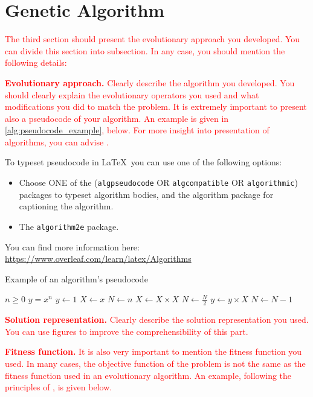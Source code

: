 \section{Genetic Algorithm}
\label{sec:algorithm}

\textcolor{red}{The third section should present the evolutionary approach you developed. You can divide this section into subsection. In any case, you should mention the following details:}

\textcolor{red}{\textbf{Evolutionary approach.} Clearly describe the algorithm you developed. You should clearly explain the evolutionary operators you used and what modifications you did to match the problem. It is extremely important to present also a pseudocode of your algorithm. An example is given in \ref{alg:pseudocode_example}, below. For more insight into presentation of algorithms, you can advise \cite{zobel2014algorithms}.}

{
\color{red}To typeset pseudocode in \LaTeX\ you can use one of the following options:
\begin{itemize}
    \item Choose ONE of the (\texttt{algpseudocode} OR \texttt{algcompatible} OR \texttt{algorithmic}) packages to typeset algorithm bodies, and the algorithm package for captioning the algorithm.
    \item The \texttt{algorithm2e} package.
\end{itemize}
You can find more information here: \url{https://www.overleaf.com/learn/latex/Algorithms}
}

\begin{algorithm}
\caption{Example of an algorithm's pseudocode}\label{alg:pseudocode_example}
\begin{algorithmic}
\Require $n \geq 0$
\Ensure $y = x^n$
\State $y \gets 1$
\State $X \gets x$
\State $N \gets n$
    \State $X \gets X \times X$
    \State $N \gets \frac{N}{2}$  
    \State $y \gets y \times X$
    \State $N \gets N - 1$
\EndIf
\EndWhile
\end{algorithmic}
\end{algorithm}

\textcolor{red}{\textbf{Solution representation.} Clearly describe the solution representation you used. You can use figures to improve the comprehensibility of this part.}

\textcolor{red}{\textbf{Fitness function.} It is also very important to mention the fitness function you used. In many cases, the objective function of the problem is not the same as the fitness function used in an evolutionary algorithm. An example, following the principles of \cite{zobel2014mathematics}, is given below.}

